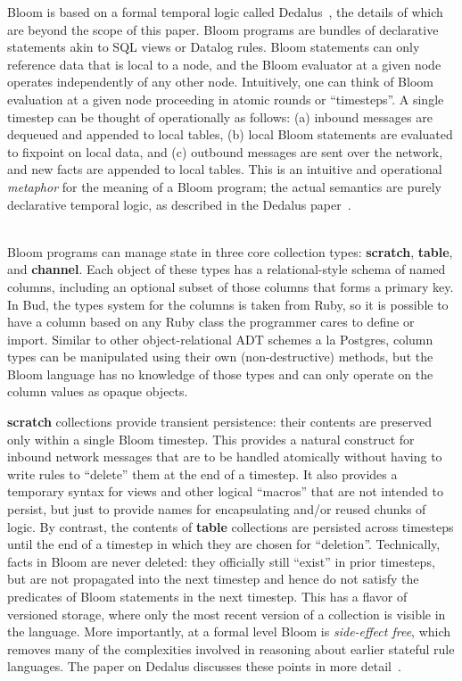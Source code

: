 Bloom is based on a formal temporal logic called Dedalus~\cite{dedalus}, the details of which are beyond the scope of this paper.  Bloom programs are bundles of declarative statements akin to SQL views or Datalog rules.  Bloom statements can only reference data that is local to a node, and the Bloom evaluator at a given node operates independently of any other node.  Intuitively, one can think of Bloom evaluation at a given node proceeding in atomic rounds or ``timesteps''. A single timestep can be thought of operationally as follows: (a) inbound messages are dequeued and appended to local tables, (b) local Bloom statements are evaluated to fixpoint on local data, and (c) outbound messages are sent over the network, and new facts are appended to local tables.  This is an intuitive and operational {\em metaphor} for the meaning of a Bloom program; the actual semantics are purely declarative temporal logic, as described in the Dedalus paper~\cite{dedalus}.

\\
\noindent
Bloom programs can manage state in three core collection types: {\bf scratch}, {\bf table}, and {\bf channel}. Each object of these types has a relational-style schema of named columns, including an optional subset of those columns that forms a primary key.  In Bud, the types system for the columns is taken from Ruby, so it is possible to have a column based on any Ruby class the programmer cares to define or import.  Similar to other object-relational ADT schemes a la Postgres, column types can be manipulated using their own (non-destructive) methods, but the Bloom language has no knowledge of those types and can only operate on the column values as opaque objects.  

{\bf scratch} collections provide transient persistence: their contents are preserved only within a single Bloom timestep.  This provides a natural construct for inbound network messages that are to be handled atomically without having to write rules to ``delete'' them at the end of a timestep.  It also provides a temporary syntax for views and other logical ``macros'' that are not intended to persist, but just to provide names for encapsulating and/or reused chunks of logic.  By contrast, the contents of {\bf table} collections are persisted across timesteps until the end of a timestep in which they are chosen for ``deletion''.  Technically, facts in Bloom are never deleted: they officially still ``exist'' in prior timesteps, but are not propagated into the next timestep and hence do not satisfy the predicates of Bloom statements in the next timestep.  This has a flavor of versioned storage, where only the most recent version of a collection is visible in the language.  More importantly, at a formal level Bloom is {\em side-effect free}, which removes many of the complexities involved in reasoning about earlier stateful rule languages.  The paper on Dedalus discusses these points in more detail~\cite{dedalus}.

